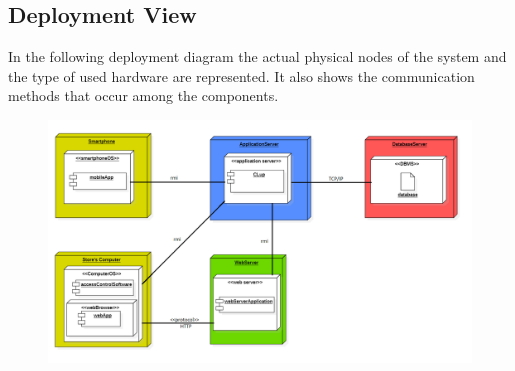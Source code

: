 \documentclass{article}
\begin{document}
\subsection{Deployment View}
In the following deployment diagram the actual physical nodes of the system and the type of used hardware are represented. It also shows the communication methods that occur among the components.\\

\begin{figure}[H]
  \includegraphics[width=\linewidth]{deployment.png}
  
\end{figure}
\end{document}
